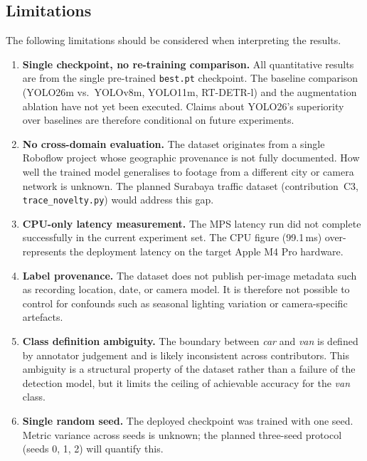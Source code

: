 \subsection{Limitations}
\label{sec:limitations}

The following limitations should be considered when interpreting the
results.

\begin{enumerate}

  \item \textbf{Single checkpoint, no re-training comparison.}
    All quantitative results are from the single pre-trained \texttt{best.pt}
    checkpoint.
    The baseline comparison (YOLO26m vs.\ YOLOv8m, YOLO11m, RT-DETR-l)
    and the augmentation ablation have not yet been executed.
    Claims about YOLO26's superiority over baselines are therefore
    conditional on future experiments.

  \item \textbf{No cross-domain evaluation.}
    The dataset originates from a single Roboflow project whose geographic
    provenance is not fully documented.
    How well the trained model generalises to footage from a different
    city or camera network is unknown.
    The planned Surabaya traffic dataset (contribution~C3,
    \texttt{trace\_novelty.py}) would address this gap.

  \item \textbf{CPU-only latency measurement.}
    The MPS latency run did not complete successfully in the current
    experiment set.
    The CPU figure (99.1\,ms) over-represents the deployment latency on
    the target Apple M4 Pro hardware.

  \item \textbf{Label provenance.}
    The dataset does not publish per-image metadata such as recording
    location, date, or camera model.
    It is therefore not possible to control for confounds such as seasonal
    lighting variation or camera-specific artefacts.

  \item \textbf{Class definition ambiguity.}
    The boundary between \textit{car} and \textit{van} is defined by
    annotator judgement and is likely inconsistent across contributors.
    This ambiguity is a structural property of the dataset rather than a
    failure of the detection model, but it limits the ceiling of achievable
    accuracy for the \textit{van} class.

  \item \textbf{Single random seed.}
    The deployed checkpoint was trained with one seed.
    Metric variance across seeds is unknown; the planned three-seed
    protocol (seeds 0, 1, 2) will quantify this.

\end{enumerate}
